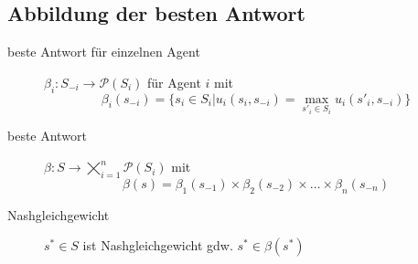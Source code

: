 \subsection{Abbildung der besten Antwort}
	\begin{description}
		\item[beste Antwort für einzelnen Agent] $\beta_{i}:S_{-i}\rightarrow\mathcal{P}(S_i)$ für Agent $i$ mit
			\[\beta_{i}(s_{-i})=\{s_i\in S_i|u_i(s_i,s_{-i})=\max\limits_{s'_i\in S_i} u_i(s'_i,s_{-i})\}\]
		\item[beste Antwort] $\beta:S\rightarrow\bigtimes\limits_{i=1}^n\mathcal{P}(S_i)$ mit
			\[\beta(s)=\beta_1(s_{-1})\times\beta_2(s_{-2})\times\dots\times\beta_n(s_{-n})\]
		\item[Nashgleichgewicht] $s^{*}\in S$ ist Nashgleichgewicht gdw. $s^{*}\in \beta(s^{*})$
	\end{description}
\topbreak
\vspace*{-2\baselineskip}
